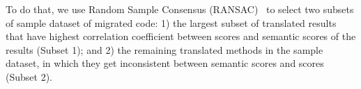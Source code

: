 To do that, we use Random Sample Consensus
(RANSAC)~\cite{Fischler:1981:RSC:358669.358692} to select two subsets
of sample dataset of migrated code: 1) the largest subset of translated
results that have highest correlation coefficient between {\model}
scores and semantic scores of the results (Subset 1); and 2) the
remaining translated methods in the sample dataset, in which they get inconsistent
between semantic scores and {\model} scores (Subset 2).
%
%
%
